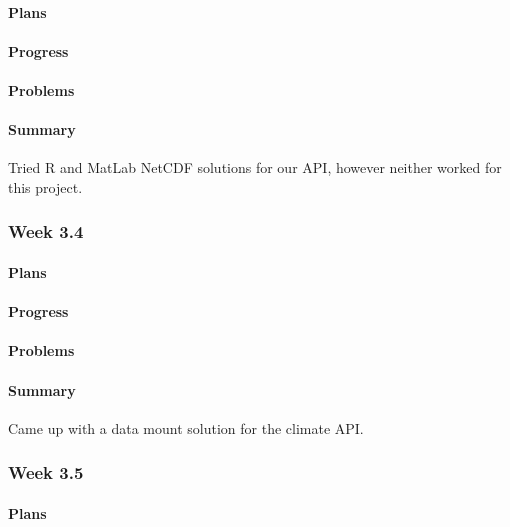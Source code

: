 \documentclass[onecolumn, draftclsnofoot,10pt, compsoc]{article}
\begin{document}
		    \paragraph{Plans} \hfill \break

		    \paragraph{Progress} \hfill \break

		    \paragraph{Problems} \hfill \break

		    \paragraph{Summary} \hfill \break
		        Tried R and MatLab NetCDF solutions for our API, however neither worked for this project.

		\subsubsection{Week 3.4}
		    \paragraph{Plans} \hfill \break

		    \paragraph{Progress} \hfill \break

		    \paragraph{Problems} \hfill \break

		    \paragraph{Summary} \hfill \break
		        Came up with a data mount solution for the climate API.

		\subsubsection{Week 3.5}
		    \paragraph{Plans} \hfill \break
\end{document}
